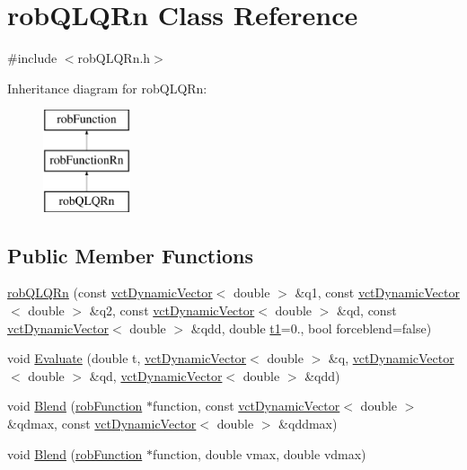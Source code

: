 \hypertarget{classrob_q_l_q_rn}{\section{rob\-Q\-L\-Q\-Rn Class Reference}
\label{classrob_q_l_q_rn}
}


{\ttfamily \#include $<$rob\-Q\-L\-Q\-Rn.\-h$>$}

Inheritance diagram for rob\-Q\-L\-Q\-Rn\-:\begin{figure}[H]
\begin{center}
\leavevmode
\includegraphics[height=3.000000cm]{db/d15/classrob_q_l_q_rn}
\end{center}
\end{figure}
\subsection*{Public Member Functions}
\begin{DoxyCompactItemize}
\item 
\hyperlink{classrob_q_l_q_rn_a299164bc482585f56221e89e058329f5}{rob\-Q\-L\-Q\-Rn} (const \hyperlink{classvct_dynamic_vector}{vct\-Dynamic\-Vector}$<$ double $>$ \&q1, const \hyperlink{classvct_dynamic_vector}{vct\-Dynamic\-Vector}$<$ double $>$ \&q2, const \hyperlink{classvct_dynamic_vector}{vct\-Dynamic\-Vector}$<$ double $>$ \&qd, const \hyperlink{classvct_dynamic_vector}{vct\-Dynamic\-Vector}$<$ double $>$ \&qdd, double \hyperlink{classrob_function_a9a4b408a3a5a8ae927caec3b6bac36ef}{t1}=0., bool forceblend=false)
\item 
void \hyperlink{classrob_q_l_q_rn_a7b6b2be1b9bfb422e5425802a9ada0a9}{Evaluate} (double t, \hyperlink{classvct_dynamic_vector}{vct\-Dynamic\-Vector}$<$ double $>$ \&q, \hyperlink{classvct_dynamic_vector}{vct\-Dynamic\-Vector}$<$ double $>$ \&qd, \hyperlink{classvct_dynamic_vector}{vct\-Dynamic\-Vector}$<$ double $>$ \&qdd)
\item 
void \hyperlink{classrob_q_l_q_rn_a293fa3654f298455cb8a94b830de191e}{Blend} (\hyperlink{classrob_function}{rob\-Function} $\ast$function, const \hyperlink{classvct_dynamic_vector}{vct\-Dynamic\-Vector}$<$ double $>$ \&qdmax, const \hyperlink{classvct_dynamic_vector}{vct\-Dynamic\-Vector}$<$ double $>$ \&qddmax)
\item 
void \hyperlink{classrob_q_l_q_rn_a67ae06b5e9c39154632ff9a0fc6334f6}{Blend} (\hyperlink{classrob_function}{rob\-Function} $\ast$function, double vmax, double vdmax)
\end{DoxyCompactItemize}
